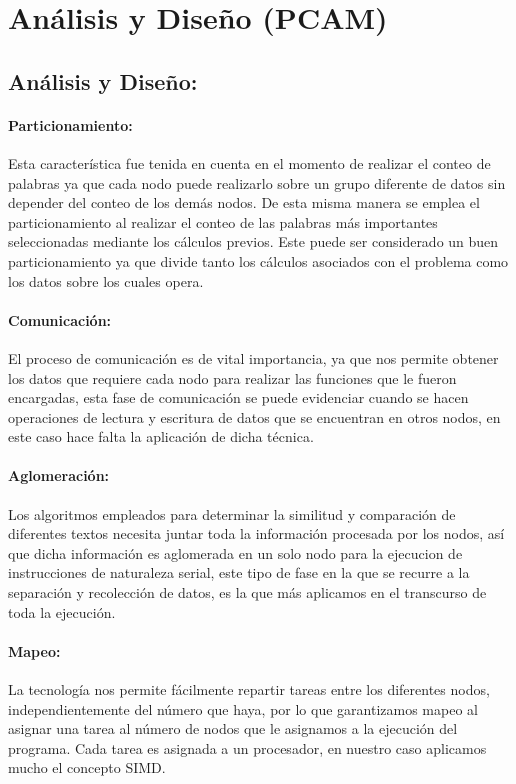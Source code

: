 \documentclass[fleqn,10pt]{SelfArx} %
\begin{document}

\section{Análisis y Diseño (PCAM)}

\subsection{Análisis y Diseño:}

\paragraph{Particionamiento:}
Esta característica fue tenida en cuenta en el momento de realizar el conteo de palabras ya que cada nodo puede realizarlo sobre un grupo diferente de datos sin depender del conteo de los demás nodos. 
De esta misma manera se emplea el particionamiento al realizar el conteo de las palabras más importantes seleccionadas  mediante los cálculos previos.
Este puede ser considerado un buen particionamiento ya que divide tanto los cálculos asociados con el problema como los datos sobre los cuales opera.

\paragraph{Comunicación:}
El proceso de comunicación es de vital importancia, ya que nos permite obtener los datos que requiere cada nodo para realizar las funciones que le fueron encargadas, esta fase de comunicación se puede evidenciar cuando se hacen operaciones de lectura y escritura de datos que se encuentran en otros nodos, en este caso hace falta la aplicación de dicha técnica.


\paragraph{Aglomeración:}
Los algoritmos empleados para determinar la similitud y comparación de diferentes textos necesita juntar toda la información procesada por los nodos, así que dicha información es aglomerada en un solo nodo para la ejecucion de instrucciones de naturaleza serial, este tipo de fase en la que se recurre a la separación y recolección de datos, es la que más aplicamos en el transcurso de toda la ejecución.

\paragraph{Mapeo:}
La tecnología nos permite fácilmente repartir tareas entre los diferentes nodos, independientemente del número que haya, por lo que garantizamos mapeo al asignar una tarea al número de nodos que le asignamos a la ejecución del programa. Cada tarea es asignada a un procesador, en nuestro caso aplicamos mucho el concepto SIMD.
\end{document}
